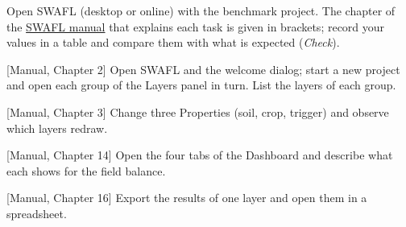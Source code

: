 {\small Open SWAFL (desktop or online) with the benchmark project. The chapter of the \href{https://github.com/halilunaziru73-creator/Coupled-Water-Fluxes-Pore-Scale-Dynamics-Precision-Irrigation-Mulching-Feedback-Loops/raw/main/Software/v1.1.0/SWAFL_Desktop/docs/manual_v1.1.0/SWAFL_Manual_v1.1.0.pdf}{SWAFL manual} that explains each task is given in brackets; record your values in a table and compare them with what is expected (\emph{Check}).}\par\vspace{3pt}
\begin{exlist}
\item {\color{khblue}[Manual, Chapter 2]} Open SWAFL and the welcome dialog; start a new project and open each group of the Layers panel in turn. List the layers of each group.\par{}
\item {\color{khblue}[Manual, Chapter 3]} Change three Properties (soil, crop, trigger) and observe which layers redraw.\par{}
\item {\color{khblue}[Manual, Chapter 14]} Open the four tabs of the Dashboard and describe what each shows for the field balance.\par{}
\item {\color{khblue}[Manual, Chapter 16]} Export the results of one layer and open them in a spreadsheet.\par{}
\end{exlist}
